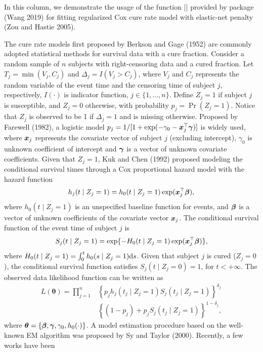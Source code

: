 In this column, we demonstrate the usage of the function
\VERB|\NormalTok{()}| provided by
 package  (Wang 2019) for fitting regularized
Cox cure rate model with elastic-net penalty (Zou and Hastie 2005).

The cure rate models first proposed by Berkson and Gage (1952) are
commonly adopted statistical methods for survival data with a cure
fraction. Consider a random sample of \(n\) subjects with
right-censoring data and a cured fraction. Let \(T_j=\min(V_j, C_j)\)
and \(\Delta_j=I(V_j > C_j)\), where \(V_j\) and \(C_j\) represents the
random variable of the event time and the censoring time of subject
\(j\), respectively, \(I(\cdot)\) is indicator function,
\(j\in\{1,\ldots,n\}\). Define \(Z_j = 1\) if subject \(j\) is
susceptible, and \(Z_j = 0\) otherwise, with probability
\(p_j = \Pr(Z_j = 1)\). Notice that \(Z_j\) is observed to be 1 if
\(\Delta_j=1\) and is missing otherwise. Proposed by Farewell (1982), a
logistic model \(p_j=1/[1+\exp(-\gamma_0-\bm{x}^{\top}_j\bm{\gamma})]\) is widely
used, where \(\bm{x}_j\) represents the covariate vector of subject \(j\)
(excluding intercept), \(\gamma_0\) is unknown coefficient of intercept
and \(\bm{\gamma}\) is a vector of unknown covariate coefficients. Given that
\(Z_j = 1\), Kuk and Chen (1992) proposed modeling the conditional
survival times through a Cox proportional hazard model with the hazard
function
\[h_j(t\mid Z_j = 1) = h_0(t\mid Z_j = 1) \exp(\bm{x}_j^{\top}\bm{\beta}),\] where
\(h_0(t\mid Z_j = 1)\) is an unspecified baseline function for events,
and \(\bm{\beta}\) is a vector of unknown coefficients of the covariate vector
\(\bm{x}_j\). The conditional survival function of the event time of
subject \(j\) is
\[S_j(t\mid Z_j = 1) = \exp\{-H_0(t\mid Z_j = 1) \exp(\bm{x}_j^{\top} \bm{\beta}) \},\]
where \(H_0(t\mid Z_j = 1) = \int_0^t h_0(s\mid Z_j = 1) \mathrm{d} s\). Given
that subject \(j\) is cured (\(Z_j = 0\)), the conditional survival
function satisfies \(S_j(t\mid Z_j=0) = 1\), for \(t<+\infty\). The
observed data likelihood function can be written as
\begin{align}\label{eqn:mod}
L(\bm{\theta}) = \prod_{j=1}^n
& \left\{ p_j h_j(t_j\mid Z_j=1) S_j(t_j\mid Z_j=1) \right\}^{\delta_j}\nonumber\\
& \left\{(1 - p_j) + p_j S_j(t_j \mid Z_j = 1)\right\}^{1-\delta_j},
\end{align} where \(\bm{\theta}=\{\bm{\beta},\bm{\gamma},\gamma_0,h_0(\cdot)\}\). A
model estimation procedure based on the well-known EM algorithm was
proposed by Sy and Taylor (2000). Recently, a few works have been
